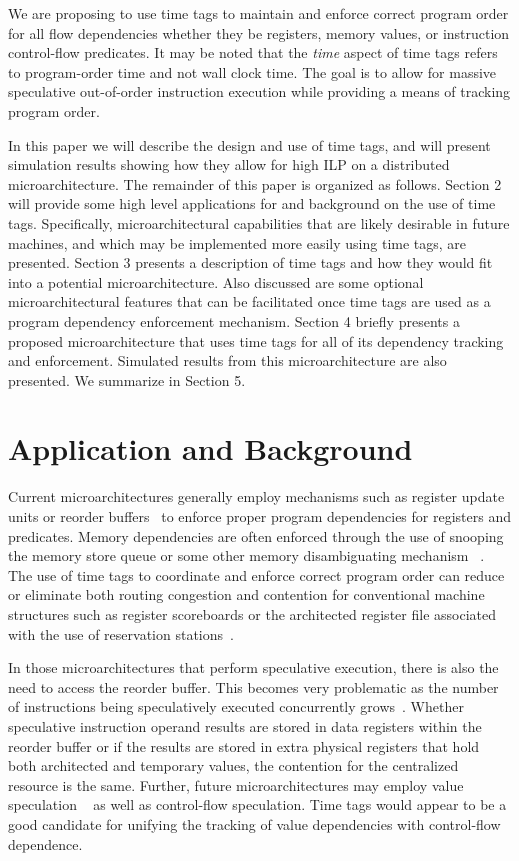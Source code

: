 \documentclass[10pt,twocolumn]{article}
\begin{document}
We are proposing to use time tags to maintain 
and enforce correct program order for all flow dependencies whether
they be registers, memory values, or instruction control-flow predicates.
It may be noted that the \textit{time} aspect of time tags
refers to program-order time and not wall clock time.
The goal is to allow for massive speculative out-of-order 
instruction execution while
providing a means of tracking program order.
 
In this paper we will describe the design and use of time tags, and 
will present simulation results showing how they allow for high ILP
on a distributed microarchitecture.  
The remainder of this paper is organized
as follows.
Section 2 will provide some high level applications for and background on
the use of time tags.  Specifically, microarchitectural capabilities
that are likely desirable in future machines, and which may be implemented 
more easily using time tags, are presented.
Section 3 presents a description of time tags and how they would
fit into a potential microarchitecture.  
Also discussed are
some optional microarchitectural features
that can be facilitated once time tags are used as
a program dependency enforcement mechanism.
Section 4 briefly presents a proposed microarchitecture
that uses time tags for all of its dependency tracking and enforcement.
Simulated results from this microarchitecture are also presented.
We summarize in Section 5.
%
%
\section{Application and Background}
%
Current microarchitectures generally employ mechanisms such as
register update units or reorder buffers~\cite{Bannon95,Kessler98,Smith95}
to enforce
proper program dependencies for registers and predicates.
Memory dependencies are often enforced through the use of
snooping the memory store queue or some other memory disambiguating
mechanism ~\cite{Sohi96}.
The use of time tags to coordinate and enforce correct program
order can reduce or eliminate both routing congestion and
contention for conventional machine structures such as
register scoreboards \cite{Thornton64} 
or the architected register file associated
with the use of reservation stations~\cite{Anderson67}.

In those microarchitectures
that perform speculative execution, there is also
the need to access the reorder buffer.  This becomes very problematic
as the number of instructions being speculatively executed concurrently
grows~\cite{Palacharla97}.  
Whether speculative instruction operand
results are stored in data registers within the reorder buffer or if the
results are stored in extra physical registers that hold both architected
and temporary values, the contention for the centralized resource is
the same.
Further, future microarchitectures may employ value speculation
~\cite{gonzalez98limits,lipasti96exceeding,lipasti97performance}
as well as control-flow speculation.
Time tags would appear to be a good candidate for unifying
the tracking of value dependencies with control-flow
dependence.
\end{document}

